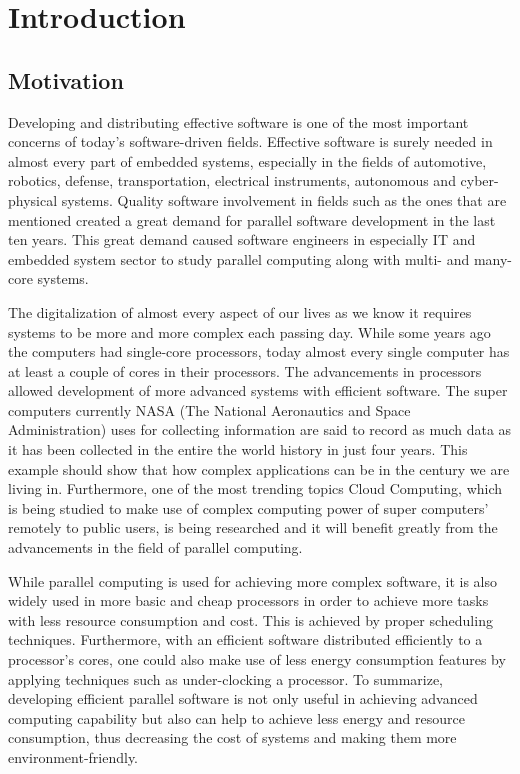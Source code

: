 
\chapter{Introduction} \label{introductionchapter}
\section{Motivation}
Developing and distributing effective software is one of the most important concerns of today's software-driven fields. Effective software is surely needed in almost every part of embedded systems, especially in the fields of automotive, robotics, defense, transportation, electrical instruments, autonomous and cyber-physical systems. Quality software involvement in fields such as the ones that are mentioned created a great demand for parallel software development in the last ten years. This great demand caused software engineers in especially IT and embedded system sector to study parallel computing along with multi- and many- core systems.

The digitalization of almost every aspect of our lives as we know it requires systems to be more and more complex each passing day. While some years ago the computers had single-core processors, today almost every single computer has at least a couple of cores in their processors. The advancements in processors allowed development of more advanced systems with efficient software. The super computers currently NASA (The National Aeronautics and Space Administration) uses for collecting information are said to record as much data as it has been collected in the entire the world history in just four years. This example should show that how complex applications can be in the century we are living in. Furthermore, one of the most trending topics Cloud Computing, which is being studied to make use of complex computing power of super computers' remotely to public users, is being researched and it will benefit greatly from the advancements in the field of parallel computing.

While parallel computing is used for achieving more complex software, it is also widely used in more basic and cheap processors in order to achieve more tasks with less resource consumption and cost. This is achieved by proper scheduling techniques. Furthermore, with an efficient software distributed efficiently to a processor's cores, one could also make use of less energy consumption features by applying techniques such as under-clocking a processor. To summarize, developing efficient parallel software is not only useful in achieving advanced computing capability but also can help to achieve less energy and resource consumption, thus decreasing the cost of systems and making them more environment-friendly.

